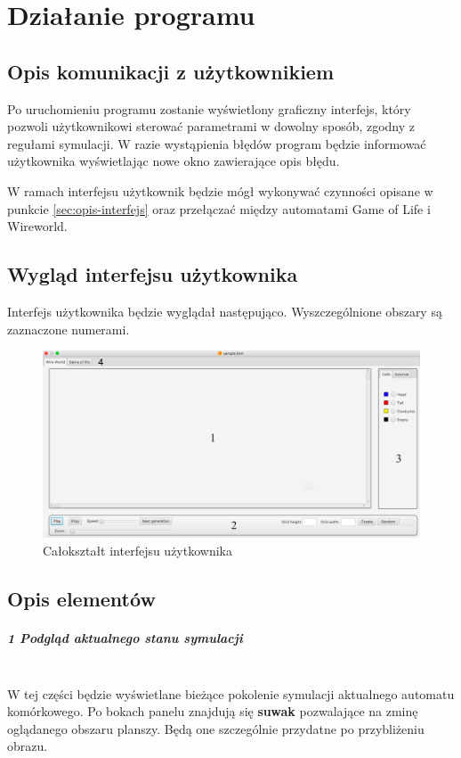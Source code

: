\documentclass{report}
\begin{document}
\chapter{Działanie programu}

\section{Opis komunikacji z użytkownikiem}
Po uruchomieniu programu zostanie wyświetlony graficzny interfejs, który pozwoli użytkownikowi sterować parametrami w dowolny sposób, zgodny z regułami symulacji. W razie wystąpienia błędów program będzie informować użytkownika wyświetlając nowe okno zawierające opis błędu.

W ramach interfejsu użytkownik będzie mógł wykonywać czynności opisane w punkcie \ref{sec:opis-interfejs} oraz przełączać między automatami Game of Life i Wireworld.

\section{Wygląd interfejsu użytkownika} \label{sec:wyglad-gui}
Interfejs użytkownika będzie wyglądał następująco. Wyszczególnione obszary są zaznaczone numerami.
\begin{figure}[H]
    \centering
    \includegraphics[width=0.99\columnwidth]{gui.png} %
    \caption{Całokształt interfejsu użytkownika}
\end{figure}

\section{Opis elementów}
\paragraph{1 Podgląd aktualnego stanu symulacji} \mbox{} \\
W tej części będzie wyświetlane bieżące pokolenie symulacji aktualnego automatu komórkowego. Po bokach panelu znajdują się \textbf{suwak} pozwalające na zminę oglądanego obszaru planszy. Będą one szczególnie przydatne po przybliżeniu obrazu.
\end{document}
